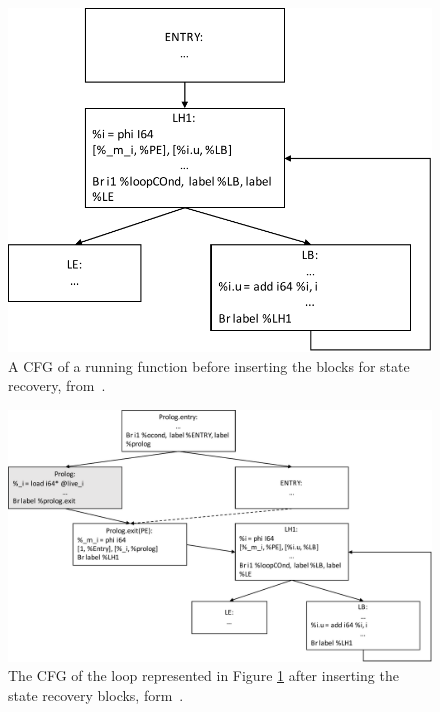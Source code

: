 \begin{figure}[h]
\centering
\includegraphics[scale=0.5]{Figures/FCFG}
\decoRule
\caption[A CFG of a running function before inserting the blocks for state recovery]{A CFG of a running function before inserting the blocks for state recovery, from~\cite{lameed2013modular}.}
\label{FCFG}
\end{figure}

\begin{figure}[h]
\centering
\includegraphics[scale=0.5]{Figures/FOptCFG}
\decoRule
\caption[The CFG of the loop represented in Figure \ref{FCFG} after inserting the state recovery blocks, form~\cite{lameed2013modular}.]{The CFG of the loop represented in Figure \ref{FCFG} after inserting the state recovery blocks, form~\cite{lameed2013modular}.}
\label{InstFCFG}
\end{figure}\\

